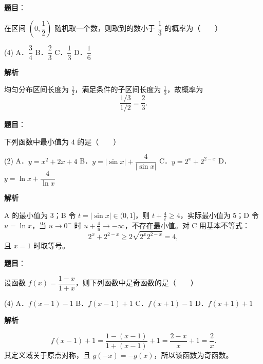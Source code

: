 \begin{answer}

\textbf{题目}：

在区间 $\left(0,\dfrac12\right)$ 随机取一个数，则取到的数小于 $\dfrac13$ 的概率为\mbox{（　　）}

\begin{gkopts}(4)
\task A．$\dfrac34$
\task B．$\dfrac23$
\task C．$\dfrac13$
\task D．$\dfrac16$
\end{gkopts}

\textbf{解析}

均匀分布区间长度为 $\frac12$，满足条件的子区间长度为 $\frac13$，故概率为
\nopagebreak[4]
\[
\frac{1/3}{1/2}=\frac23.
\]


\end{answer}
\begin{answer}

\textbf{题目}：

下列函数中最小值为 $4$ 的是\mbox{（　　）}

\begin{gkopts}(2)
\task A．$y=x^2+2x+4$
\task B．$y=|\sin x|+\dfrac4{|\sin x|}$
\task C．$y=2^x+2^{2-x}$
\task D．$y=\ln x+\dfrac4{\ln x}$
\end{gkopts}

\textbf{解析}

A 的最小值为 $3$；B 令 $t=|\sin x|\in(0,1]$，则 $t+\frac4t\geqslant4$，实际最小值为 $5$；D 令 $u=\ln x$，当 $u\to0^-$ 时 $u+\frac4u\to-\infty$，不存在最小值。对 C 用基本不等式：
\nopagebreak[4]
\[
2^x+2^{2-x}\geqslant2\sqrt{2^x2^{2-x}}=4,
\]
且 $x=1$ 时取等号。


\end{answer}
\begin{answer}

\textbf{题目}：

设函数 $f(x)=\dfrac{1-x}{1+x}$，则下列函数中是奇函数的是\mbox{（　　）}

\begin{gkopts}(4)
\task A．$f(x-1)-1$
\task B．$f(x-1)+1$
\task C．$f(x+1)-1$
\task D．$f(x+1)+1$
\end{gkopts}

\textbf{解析}

\nopagebreak[4]
\[
f(x-1)+1=\frac{1-(x-1)}{1+(x-1)}+1=\frac{2-x}{x}+1=\frac2x.
\]
其定义域关于原点对称，且 $g(-x)=-g(x)$，所以该函数为奇函数。


\end{answer}
